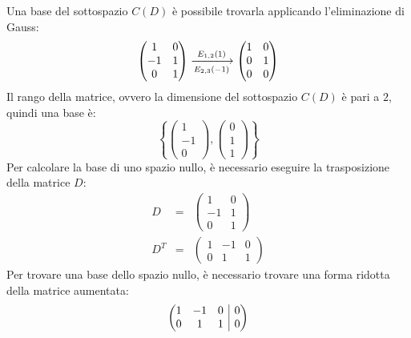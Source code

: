 \documentclass[a4paper]{article}
\makeatletter
\newenvironment{rowequmat}[1]{\left(\array{@{}#1@{}}}{\endarray\right)}
\makeatother
\begin{document}
	\noindent
	Una base del sottospazio $C\left(D\right)$ è possibile trovarla applicando l'eliminazione di Gauss:
	\begin{equation*}
		\begin{pmatrix}
			1 & 0 \\
			-1 & 1 \\
			0 & 1
		\end{pmatrix}
		\xlongrightarrow[E_{2,3}\left(-1\right)]{E_{1,2}\left(1\right)}
		\begin{pmatrix}
			1 & 0 \\
			0 & 1 \\
			0 & 0
		\end{pmatrix}
	\end{equation*}
	Il rango della matrice, ovvero la dimensione del sottospazio $C\left(D\right)$ è pari a $2$, quindi una base è:
	\begin{equation*}
		\left\{
			\begin{pmatrix}
				1 \\ -1 \\ 0
			\end{pmatrix},
			\begin{pmatrix}
				0 \\ 1 \\ 1
			\end{pmatrix}
		\right\}
	\end{equation*}
	Per calcolare la base di uno spazio nullo, è necessario eseguire la trasposizione della matrice $D$:
	\begin{equation*}
		\begin{array}{rll}
			D &=& \begin{pmatrix}
				1 & 0 \\
				-1 & 1 \\
				0 & 1
			\end{pmatrix} \\ [2em]
			D^{T} &=& \begin{pmatrix}
				1 & -1 & 0 \\
				0 & 1  & 1
			\end{pmatrix}
		\end{array}
	\end{equation*}
	Per trovare una base dello spazio nullo, è necessario trovare una forma ridotta della matrice aumentata:
	\begin{equation*}
		\begin{rowequmat}{ccc|c}
			1 & -1 & 0 & 0 \\
			0 & 1  & 1 & 0
		\end{rowequmat}
	\end{equation*}
\end{document}
